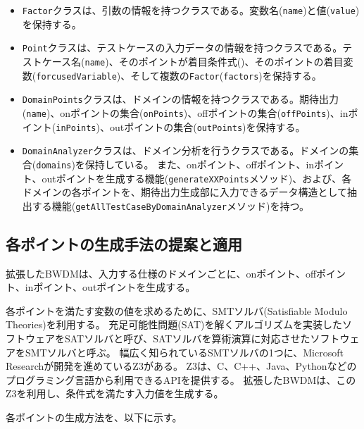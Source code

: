 \documentclass[uplatex, report, a4j, 10pt]{jsbook}
\newcommand\ttt[1]{\texttt{#1}}
\begin{document}
\begin{itemize}
  \item \ttt{Factor}クラスは、引数の情報を持つクラスである。変数名(\ttt{name})と値(\ttt{value})を保持する。
  \item \ttt{Point}クラスは、テストケースの入力データの情報を持つクラスである。テストケース名(\ttt{name})、そのポイントが着目条件式(\forcusedConditionalExpression{})、そのポイントの着目変数(\ttt{forcusedVariable})、そして複数の\ttt{Factor}(\ttt{factors})を保持する。
  \item \ttt{DomainPoints}クラスは、ドメインの情報を持つクラスである。期待出力(\ttt{name})、onポイントの集合(\ttt{onPoints})、offポイントの集合(\ttt{offPoints})、inポイント(\ttt{inPoints})、outポイントの集合(\ttt{outPoints})を保持する。
  \item \ttt{DomainAnalyzer}クラスは、ドメイン分析を行うクラスである。ドメインの集合(\ttt{domains})を保持している。
        また、onポイント、offポイント、inポイント、outポイントを生成する機能(\ttt{generateXXPoints}メソッド)、および、各ドメインの各ポイントを、期待出力生成部に入力できるデータ構造として抽出する機能(\ttt{getAllTestCaseByDomainAnalyzer}メソッド)を持つ。

\end{itemize}

\subsection{各ポイントの生成手法の提案と適用}\label{cha:create_point}
拡張したBWDMは、入力する仕様のドメインごとに、onポイント、offポイント、inポイント、outポイントを生成する。

各ポイントを満たす変数の値を求めるために、SMTソルバ(Satisfiable Modulo Theories)\cite{sat}を利用する。
充足可能性問題(SAT)を解くアルゴリズムを実装したソフトウェアをSATソルバと呼び、SATソルバを算術演算に対応させたソフトウェアをSMTソルバと呼ぶ。
幅広く知られているSMTソルバの1つに、Microsoft Researchが開発を進めているZ3\cite{z3}がある。
Z3は、C、C++、Java、Pythonなどのプログラミング言語から利用できるAPIを提供する。
拡張したBWDMは、このZ3を利用し、条件式を満たす入力値を生成する。

各ポイントの生成方法を、以下に示す。
\end{document}
